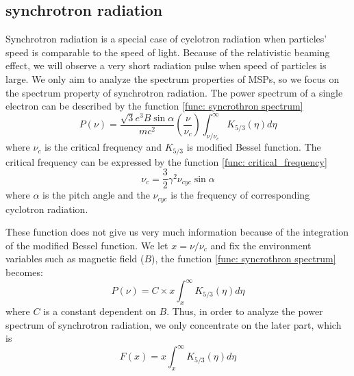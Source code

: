 \documentclass[12pt]{report}
\begin{document}
        \subsection{synchrotron radiation}
          Synchrotron radiation is a special case of cyclotron radiation when particles' speed is comparable to the 
          speed of light. Because of the relativistic beaming effect, we will observe a very short radiation pulse 
          when speed of particles is large. 
          We only aim to analyze the spectrum properties of MSPs, so we focus on the 
          spectrum property of synchrotron radiation. The power spectrum of a single electron  
          can be described by the function \ref{func: syncrothron spectrum}
          \begin{equation}
            \label{func: syncrothron spectrum}
            P\left(\nu\right) = \frac{\sqrt{3} e^3 B \sin{\alpha}}{m c^2} 
              \left(\frac{\nu}{\nu_c}\right) \int_{\nu / \nu_c}^{\infty} K_{5/3}\left(\eta \right)d\eta 
          \end{equation}
          where $\nu_c$ is the critical frequency and $K_{5/3}$ is modified Bessel function. The critical frequency 
          can be expressed by the function \ref{func: critical_frequency}
          \begin{equation}
            \label{func: critical_frequency}
            \nu_c = \frac{3}{2} \gamma^2 \nu_{cyc} \sin{\alpha}
          \end{equation} 
          where $\alpha$ is the pitch angle and the $\nu_{cyc}$ is the frequency of corresponding cyclotron radiation. 

          These function does not give us very much information because of the integration of the modified Bessel 
          function. We let $x = \nu / \nu_c$ and fix the environment variables such as magnetic field ($B$), 
          the function \ref{func: syncrothron spectrum} becomes: 
          \begin{equation}
            \label{func: to_x}
            P\left(\nu\right) = C \times x \int_{x}^{\infty} K_{5/3}\left(\eta \right)d\eta 
          \end{equation}
          where $C$ is a constant dependent on $B$. Thus, in order to analyze the power spectrum of synchrotron radiation,
          we only concentrate on the later part, which is
          \begin{equation}
            \label{func: fx}
            F\left(x\right) = x \int_{x}^{\infty} K_{5/3}\left(\eta \right)d\eta 
          \end{equation}
          
\end{document}
